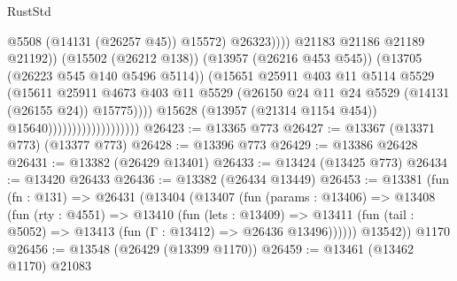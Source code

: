 \begin{lexlean}{RustStd}
\begin{coremodule}
                                                          @5508
                                                          (@14131 (@26257 @45))
                                                          @15572)
                                                        @26323))))
                                                @21183
                                                @21186
                                                @21189
                                                @21192))
                                            (@15502 (@26212 @138))
                                            (@13957 (@26216 @453 @545))
                                            (@13705 (@26223 @545 @140 @5496 @5114))
                                            (@15651
                                              @25911
                                              @403
                                              @11
                                              @5114
                                              @5529
                                              (@15611
                                                @25911
                                                @4673
                                                @403
                                                @11
                                                @5529
                                                (@26150
                                                  @24
                                                  @11
                                                  @24
                                                  @5529
                                                  (@14131 (@26155 @24))
                                                  @15775))))
                                          @15628
                                          (@13957 (@21314 @1154 @454))
                                          @15640)))))))))))))))))))
@26423 := @13365 @773
@26427 := @13367 (@13371 @773) (@13377 @773)
@26428 := @13396 @773
@26429 := @13386 @26428
@26431 := @13382 (@26429 @13401)
@26433 := @13424 (@13425 @773)
@26434 := @13420 @26433
@26436 := @13382 (@26434 @13449)
@26453 := @13381
    (fun (fn : @131) =>
    @26431
      (@13404
        (@13407
          (fun (params : @13406) =>
          @13408
            (fun (rty : @4551) =>
            @13410
              (fun (lets : @13409) =>
              @13411 (fun (tail : @5052) => @13413 (fun (Γ : @13412) => @26436 @13496))))))
        @13542))
    @1170
@26456 := @13548 (@26429 (@13399 @1170))
@26459 := @13461 (@13462 @1170) @21083

\end{coremodule}
\end{lexlean}
